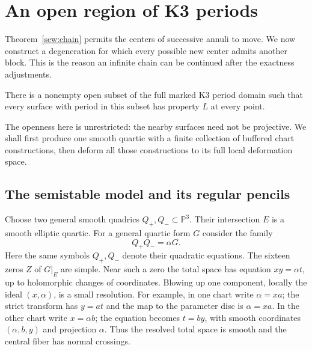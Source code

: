 \section{An open region of K3 periods}
\label{deg:section}

Theorem~\ref{sew:chain} permits the centers of successive annuli to
move.  We now construct a degeneration for which every possible new
center admits another block.  This is the reason an infinite chain
can be continued after the exactness adjustments.

\begin{proposition}\label{deg:open}
There is a nonempty open subset of the full marked K3 period domain
such that every surface with period in this subset has property $L$
at every point.
\end{proposition}

The openness here is unrestricted: the nearby surfaces need not be
projective.  We shall first produce one smooth quartic with a finite
collection of buffered chart constructions, then deform all those
constructions to its full local deformation space.

\subsection{The semistable model and its regular pencils}

Choose two general smooth quadrics $Q_+,Q_-\subset\mathbb P^3$.
Their intersection $E$ is a smooth elliptic quartic.  For a general
quartic form $G$ consider the family
\begin{equation}\label{deg:quartic-family}
                         Q_+Q_-=\alpha G.
\end{equation}
Here the same symbols $Q_+,Q_-$ denote their quadratic equations.
The sixteen zeros $Z$ of $G|_E$ are simple.  Near such a zero the
total space has equation $xy=\alpha t$, up to holomorphic changes
of coordinates.  Blowing up one component, locally the ideal
$(x,\alpha)$, is a small resolution.  For example, in one chart
write $\alpha=xa$; the strict transform has $y=at$ and the map to
the parameter disc is $\alpha=xa$.  In the other chart write
$x=\alpha b$; the equation becomes $t=by$, with smooth coordinates
$(\alpha,b,y)$ and projection $\alpha$.  Thus the resolved total
space is smooth and the central fiber has normal crossings.

